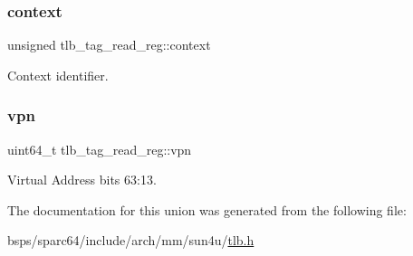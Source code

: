 \subsubsection{\texorpdfstring{context}{context}}
{\footnotesize\ttfamily unsigned tlb\+\_\+tag\+\_\+read\+\_\+reg\+::context}

Context identifier. \mbox{\label{uniontlb__tag__read__reg_a4af73c3f0e6d28c433b8ee3c408ec79a}} 
\subsubsection{\texorpdfstring{vpn}{vpn}}
{\footnotesize\ttfamily uint64\+\_\+t tlb\+\_\+tag\+\_\+read\+\_\+reg\+::vpn}

Virtual Address bits 63\+:13. 

The documentation for this union was generated from the following file\+:\begin{DoxyCompactItemize}
\item 
bsps/sparc64/include/arch/mm/sun4u/\mbox{\hyperlink{sun4u_2tlb_8h}{tlb.\+h}}\end{DoxyCompactItemize}
